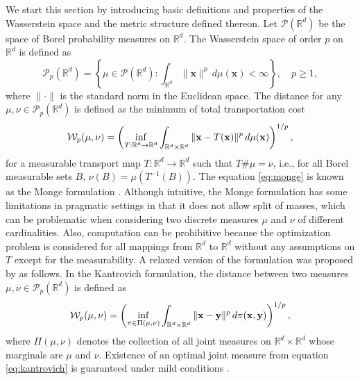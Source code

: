 \documentclass[11pt]{article}
\newcommand{\calP}{\mathcal{P}}
\newcommand{\calW}{\mathcal{W}}
\newcommand{\bbR}{\mathbb{R}}
\newcommand{\bfx}{\mathbf{x}}
\newcommand{\Rd}{\mathbb{R}^d}
\begin{document}
We start this section by introducing basic definitions and properties of the Wasserstein space and the metric structure defined thereon. Let $\calP(\bbR^d)$ be the space of Borel probability measures on $\bbR^d$. The Wasserstein space of order $p$ on $\bbR^d$ is defined as 
\begin{equation*}
	\calP_p (\bbR^d) = \left\lbrace \mu \in \calP(\bbR^d) : \int_{\bbR^d} \|\bfx\|^p \, d\mu (\bfx) < \infty \right\rbrace,\quad p\geq 1,
\end{equation*}
where $\|\cdot \|$ is the standard norm in the Euclidean space. The distance for any $\mu, \nu \in \calP_p (\bbR^d)$ is defined as the minimum of total transportation cost 
\begin{equation}\label{eq:monge}
	\calW_p (\mu,\nu) = \left( \underset{T:\Rd \rightarrow \Rd}{\inf} \int_{\Rd \times \Rd } \|{\bf x}-T({\bf x})\|^p \, d\mu({\bf x})\right)^{1/p},
\end{equation}
for a measurable transport map $T:\Rd \rightarrow \Rd$ such that $T\# \mu = \nu$, i.e., for all Borel measurable sets $B$, $\nu(B) = \mu(T^{-1}(B))$. The equation \eqref{eq:monge} is known as the Monge formulation \citep{monge_1781_MemoireTheorieDeblais}. Although intuitive, the Monge formulation has some limitations in pragmatic settings in that it does not allow split of masses, which can be problematic when considering two discrete measures $\mu$ and $\nu$ of different cardinalities. Also, computation can be prohibitive because the optimization problem is considered for all mappings from $\Rd$ to $\Rd$ without any assumptions on $T$ except for the measurability. A relaxed version of the formulation was proposed by \cite{kantorovitch_1958_TranslocationMasses} as follows. In the Kantrovich formulation, the distance between two measures $\mu,\nu \in \calP_p (\Rd)$ is defined as
\begin{equation}\label{eq:kantrovich}
	\calW_p (\mu,\nu) = \left( \underset{\pi \in \Pi(\mu,\nu)}{\inf} \int_{\Rd \times \Rd } \|{\bf x}-{\bf y}\|^p  \, d\pi({\bf x},{\bf y})\right)^{1/p},
\end{equation}
where $\Pi(\mu,\nu)$ denotes the collection of all joint measures on $\Rd \times \Rd$ whose marginals are $\mu$ and $\nu$. Existence of an optimal joint measure from equation \eqref{eq:kantrovich} is guaranteed under mild conditions \citep{villani_2003_TopicsOptimalTransportation}. 



\end{document}
